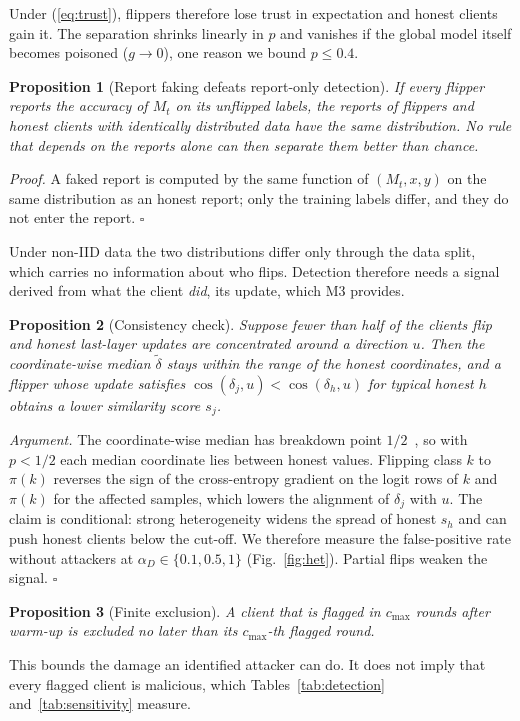 \documentclass[conference]{IEEEtran}
\newtheorem{proposition}{Proposition}
\begin{document}
Under (\ref{eq:trust}), flippers therefore lose trust in expectation and honest clients gain it. The separation shrinks linearly in $p$ and vanishes if the global model itself becomes poisoned ($g\to 0$), one reason we bound $p\le 0.4$.

\begin{proposition}[Report faking defeats report-only detection]\label{prop:faking}
If every flipper reports the accuracy of $M_t$ on its unflipped labels, the reports of flippers and honest clients with identically distributed data have the same distribution. No rule that depends on the reports alone can then separate them better than chance.
\end{proposition}
\emph{Proof.} A faked report is computed by the same function of $(M_t, x, y)$ on the same distribution as an honest report; only the training labels differ, and they do not enter the report. \hfill$\square$

Under non-IID data the two distributions differ only through the data split, which carries no information about who flips. Detection therefore needs a signal derived from what the client \emph{did}, its update, which M3 provides.

\begin{proposition}[Consistency check]\label{prop:cc}
Suppose fewer than half of the clients flip and honest last-layer updates are concentrated around a direction $u$. Then the coordinate-wise median $\tilde\delta$ stays within the range of the honest coordinates, and a flipper whose update satisfies $\cos(\delta_j,u)<\cos(\delta_h,u)$ for typical honest $h$ obtains a lower similarity score $s_j$.
\end{proposition}
\emph{Argument.} The coordinate-wise median has breakdown point $1/2$~\cite{yin2018byzantine}, so with $p<1/2$ each median coordinate lies between honest values. Flipping class $k$ to $\pi(k)$ reverses the sign of the cross-entropy gradient on the logit rows of $k$ and $\pi(k)$ for the affected samples, which lowers the alignment of $\delta_j$ with $u$. The claim is conditional: strong heterogeneity widens the spread of honest $s_h$ and can push honest clients below the cut-off. We therefore measure the false-positive rate without attackers at $\alpha_D\in\{0.1,0.5,1\}$ (Fig.~\ref{fig:het}). Partial flips weaken the signal. \hfill$\square$

\begin{proposition}[Finite exclusion]
A client that is flagged in $c_{\max}$ rounds after warm-up is excluded no later than its $c_{\max}$-th flagged round.
\end{proposition}
This bounds the damage an identified attacker can do. It does not imply that every flagged client is malicious, which Tables~\ref{tab:detection} and~\ref{tab:sensitivity} measure.
\end{document}
